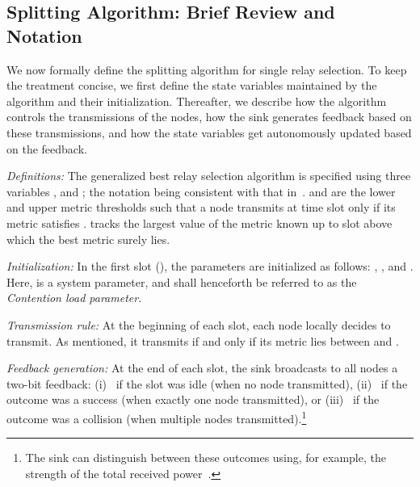 \documentclass[12pt,draftcls,peerreview, onecolumn]{IEEEtran}
\begin{document}
\subsection{Splitting Algorithm: Brief Review and Notation}

We now formally define the splitting algorithm for single relay
selection. To keep the treatment concise, we first define the state
variables maintained by the algorithm and their initialization.
Thereafter, we describe how the algorithm controls the transmissions
of the nodes, how the sink generates feedback based on these
transmissions, and how the state variables get autonomously updated
based on the feedback.

{\em Definitions:} The generalized best relay selection algorithm is
specified using three variables ,  and ;
the notation being consistent with that in~\cite{qin_infocomm_2004}.
 and  are the lower and upper metric thresholds such
that a node  transmits at time slot  only if its metric 
satisfies .   tracks the largest
value of the metric known up to slot  above which the best metric
surely lies.


{\em Initialization:} In the first slot (), the parameters are
initialized as follows: , , and . Here,  is a system parameter, and
shall henceforth be referred to as the {\em Contention load parameter}.

{\em Transmission rule:} At the beginning of each slot, each node
locally decides to transmit. As mentioned, it transmits if and only if
its metric lies between  and .

{\em Feedback generation:} At the end of each slot, the sink
broadcasts to all nodes a two-bit feedback: (i)~ if the slot was idle (when no node
transmitted), (ii)~ if the outcome was a success (when exactly one
node transmitted), or (iii)~ if the outcome was a collision (when
multiple nodes transmitted).\footnote{The sink can distinguish between
  these outcomes using, for example, the strength of the total
  received power~\cite{yim_2008_ICC}.}
\end{document}
